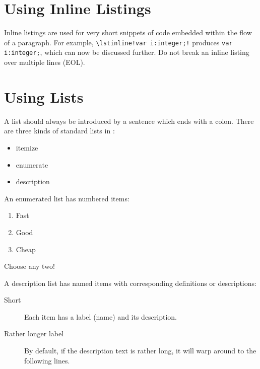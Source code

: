 \section{Using Inline Listings}

Inline listings are used for very short snippets of code embedded
within the flow of a paragraph. For example,
\lstinline|\lstinline!var i:integer;!|
produces
\lstinline!var i:integer;!, which can now be discussed further.
Do not break an inline listing over multiple lines (EOL).




\section{Using Lists}

A list should always be introduced by a sentence
which ends with a colon.
%
There are three kinds of standard lists in \LaTeXe:
\begin{itemize}
\item itemize
\item enumerate
\item description
\end{itemize}
An enumerated list has numbered items:
\begin{enumerate}
\item Fast
\item Good
\item Cheap
\end{enumerate}
Choose any two!


A description list has named items with corresponding
definitions or descriptions:
\begin{description}
\item[Short] Each item has a label (name) and its description.

\item[Rather longer label] By default, if the description text
  is rather long, it will warp around to the following lines.
\end{description}



